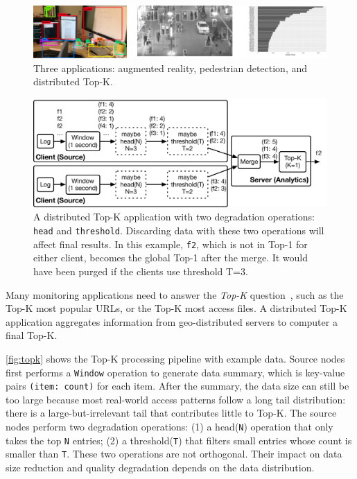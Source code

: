 \documentclass[twocolumn, 9pt]{article}
\begin{document}
\begin{figure}
  \centering
  \includegraphics[width=\columnwidth]{figures/apps.pdf}
  \caption{Three applications: augmented reality, pedestrian detection, and
    distributed Top-K.}
  \label{fig:three-apps}
\end{figure}

\begin{figure}
  \centering
  \includegraphics[width=\columnwidth]{figures/topk.pdf}
  \caption{A distributed Top-K application with two degradation operations:
    \texttt{head} and \texttt{threshold}. Discarding data with these two
    operations will affect final results. In this example, \texttt{f2}, which is
    not in Top-1 for either client, becomes the global Top-1 after the merge. It
    would have been purged if the clients use threshold T=3.}
  \label{fig:topk}
\end{figure}

 Many monitoring applications need to answer the
\textit{Top-K} question~\cite{babcock2003distributed}, such as the Top-K most
popular URLs, or the Top-K most access files. A distributed Top-K application
aggregates information from geo-distributed servers to computer a final Top-K.

\autoref{fig:topk} shows the Top-K processing pipeline with example data. Source
nodes first performs a \texttt{Window} operation to generate data summary, which
is key-value pairs \texttt{(item: count)} for each item. After the summary, the
data size can still be too large because most real-world access patterns follow
a long tail distribution: there is a large-but-irrelevant tail that contributes
little to Top-K. The source nodes perform two degradation operations: (1) a
head(\texttt{N}) operation that only takes the top \texttt{N} entries; (2) a
threshold(\texttt{T}) that filters small entries whose count is smaller than
\texttt{T}. These two operations are not orthogonal. Their impact on data size
reduction and quality degradation depends on the data distribution.
\end{document}
